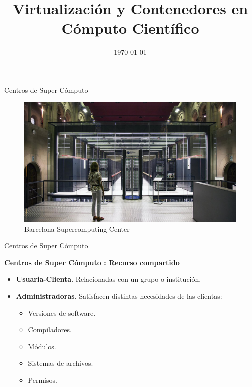 \documentclass[11pt]{beamer}
\title[]{Virtualización y Contenedores en Cómputo Científico}
\institute[ITESM]{Data Pub\\ ITESM}
\date{\today}
\begin{document}
\begin{frame}
\titlepage
\end{frame}


\begin{frame}{Centros de Super Cómputo}
	\begin{figure}
		\includegraphics[scale=0.2]{images/barcelona_supercomputing.jpg}
		\caption{Barcelona Supercomputing Center}
	\end{figure}
\end{frame}

\begin{frame}{Centros de Super Cómputo}
	\begin{center}
		\textbf{Centros de Super Cómputo : Recurso compartido}
	\end{center}
	
	\begin{itemize}
		\item  \textbf{Usuaria-Clienta}. Relacionadas con un grupo o institución.
		\item \textbf{Administradoras}. Satisfacen distintas necesidades de las clientas:
			\begin{itemize}
				\item Versiones de software.
				\item Compiladores.
				\item Módulos.
				\item Sistemas de archivos.
				\item Permisos.
			\end{itemize}
		
	\end{itemize}

\end{frame}
\end{document}
